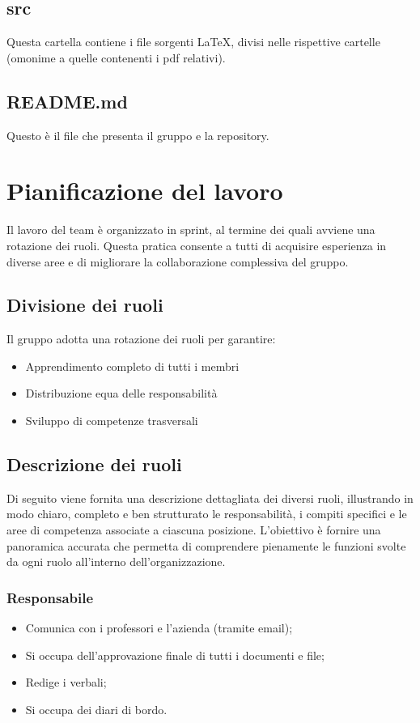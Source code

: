 \documentclass[11pt,a4paper]{article}
\begin{document}
\subsection{src}
Questa cartella contiene i file sorgenti LaTeX, divisi nelle rispettive cartelle (omonime a quelle contenenti i pdf relativi).

\subsection{README.md}
Questo è il file che presenta il gruppo e la repository.

\newpage

\section{Pianificazione del lavoro}
Il lavoro del team è organizzato in sprint, al termine dei quali avviene una rotazione dei ruoli. Questa pratica consente a tutti di acquisire esperienza in diverse aree e di migliorare la collaborazione complessiva del gruppo.

\subsection{Divisione dei ruoli}
Il gruppo adotta una rotazione dei ruoli per garantire:
\begin{itemize}
    \item Apprendimento completo di tutti i membri
    \item Distribuzione equa delle responsabilità
    \item Sviluppo di competenze trasversali
\end{itemize}

\subsection{Descrizione dei ruoli}
Di seguito viene fornita una descrizione dettagliata dei diversi ruoli, illustrando in modo chiaro, completo e ben strutturato le responsabilità, i compiti specifici e le aree di competenza associate a ciascuna posizione. L’obiettivo è fornire una panoramica accurata che permetta di comprendere pienamente le funzioni svolte da ogni ruolo all’interno dell’organizzazione.

\subsubsection{Responsabile}
\begin{itemize}
    \item Comunica con i professori e l'azienda (tramite email);
    \item Si occupa dell'approvazione finale di tutti i documenti e file;
    \item Redige i verbali;
    \item Si occupa dei diari di bordo.
\end{itemize}
\end{document}
